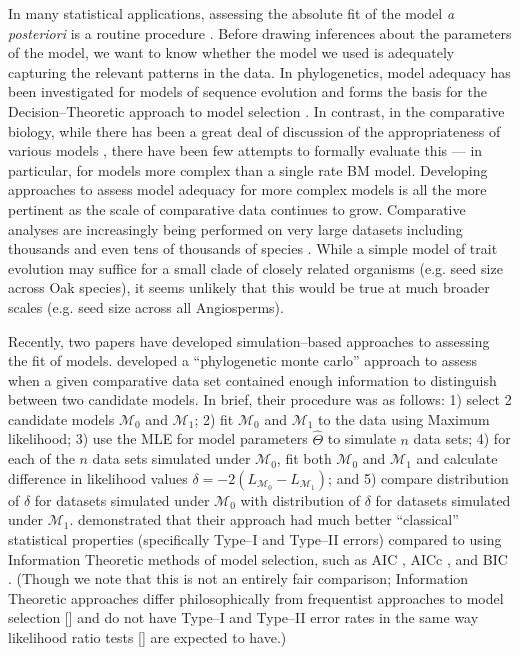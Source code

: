 \documentclass[12pt]{article}
\begin{document}
In many statistical applications, assessing the absolute fit of the model \textit{a posteriori} is a routine procedure \citep[see, for example,][ch. 6]{Gelmanbook}. Before drawing inferences about the parameters of the model, we want to know whether the model we used is adequately capturing the relevant patterns in the data. In phylogenetics, model adequacy has been investigated for models of sequence evolution \citep[e.g.][]{GautLewis1995, SullivanSwofford, Goldman, HuelsenbeckBull1996, SandersonKim, Bollback2002, Ripplinger2010, Lewis2013, Brown2013} and forms the basis for the Decision--Theoretic approach to model selection \citep{Minin2003, Abdo2005, SullivanJoyce2005}. In contrast, in the comparative biology, while there has been a great deal of discussion of the appropriateness of various models \citep[e.g.][]{Felsenstein1985, Felsenstein1988, HarveyPagel1991, Pagel1993, Diaz1996, Price1997, GarlandIves2000, Rohlf2006, Freckleton2009, Hansen2012}, there have been few attempts to formally evaluate this --- in particular, for models more complex than a single rate BM model. Developing approaches to assess model adequacy for more complex models is all the more pertinent as the scale of comparative data continues to grow. Comparative analyses are increasingly being performed on very large datasets including thousands and even tens of thousands of species \citep[e.g.][]{Coopermammal, Jetz2012, Rabosky2013, Cornwell2013, PyronBubrink2013, Zanne2013}. While a simple model of trait evolution may suffice for a small clade of closely related organisms (e.g. seed size across Oak species), it seems unlikely that this would be true at much broader scales (e.g. seed size across all Angiosperms).

Recently, two papers have developed simulation--based approaches to assessing the fit of models. \citet{Boettiger2012} developed a ``phylogenetic monte carlo'' approach to assess when a given comparative data set contained enough information to distinguish between two candidate models. In brief, their procedure was as follows: 1) select 2 candidate models $\mathcal{M}_0$ and $\mathcal{M}_1$; 2) fit $\mathcal{M}_0$ and $\mathcal{M}_1$ to the data using Maximum likelihood; 3) use the MLE for model parameters $\hat{\Theta}$ to simulate $n$ data sets; 4) for each of the $n$ data sets simulated under $\mathcal{M}_0$, fit both $\mathcal{M}_0$ and $\mathcal{M}_1$ and calculate difference in likelihood values $\delta = -2(L_{\mathcal{M}_0} - L_{\mathcal{M}_1})$; and 5) compare distribution of $\delta$ for datasets simulated under $\mathcal{M}_0$ with distribution of $\delta$ for datasets simulated under $\mathcal{M}_1$. \citet{Boettiger2012} demonstrated that their approach had much better ``classical'' statistical properties (specifically Type--I and Type--II errors) compared to using Information Theoretic methods of model selection, such as AIC \citep{Akaike1973}, AICc \citep{AICC}, and BIC \citep{Schwarz1978}. (Though we note that this is not an entirely fair comparison; Information Theoretic approaches differ philosophically from frequentist approaches to model selection [\citealt{BA2004}] and do not have Type--I and Type--II error rates in the same way likelihood ratio tests [\citealt{Wilks1938}] are expected to have.)
\end{document}
